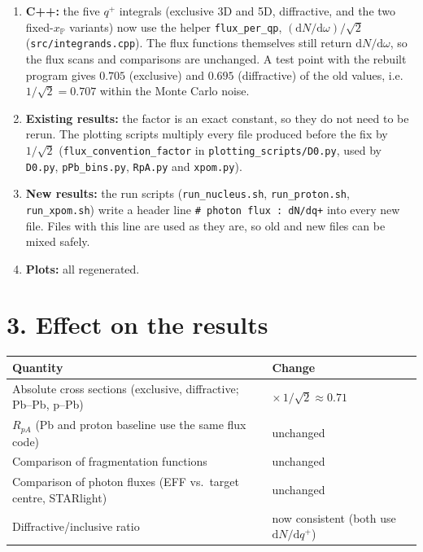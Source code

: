 \documentclass[12pt]{article}
\newcommand{\xpo}{x_{\mathbb{P}}}
\begin{document}
\begin{enumerate}
\item \textbf{C++:} the five $q^+$ integrals (exclusive 3D and 5D, diffractive, and the two
  fixed-$\xpo$ variants) now use the helper \texttt{flux\_per\_qp},
  $(\mathrm{d}N/\mathrm{d}\omega)/\sqrt2$ (\texttt{src/integrands.cpp}). The flux functions
  themselves still return $\mathrm{d}N/\mathrm{d}\omega$, so the flux scans and comparisons are
  unchanged. A test point with the rebuilt program gives $0.705$ (exclusive) and $0.695$ (diffractive)
  of the old values, i.e.\ $1/\sqrt2=0.707$ within the Monte Carlo noise.
\item \textbf{Existing results:} the factor is an exact constant, so they do not need to be rerun.
  The plotting scripts multiply every file produced before the fix by $1/\sqrt2$
  (\texttt{flux\_convention\_factor} in \texttt{plotting\_scripts/D0.py}, used by \texttt{D0.py},
  \texttt{pPb\_bins.py}, \texttt{RpA.py} and \texttt{xpom.py}).
\item \textbf{New results:} the run scripts (\texttt{run\_nucleus.sh}, \texttt{run\_proton.sh},
  \texttt{run\_xpom.sh}) write a header line \texttt{\# photon flux : dN/dq+} into every new file.
  Files with this line are used as they are, so old and new files can be mixed safely.
\item \textbf{Plots:} all regenerated.
\end{enumerate}

\section*{3. Effect on the results}

\begin{center}
\begin{tabular}{ll}
\toprule
Quantity & Change \\
\midrule
Absolute cross sections (exclusive, diffractive; Pb--Pb, p--Pb) & $\times\,1/\sqrt2\approx0.71$ \\
$R_{pA}$ (Pb and proton baseline use the same flux code) & unchanged \\
Comparison of fragmentation functions & unchanged \\
Comparison of photon fluxes (EFF vs.\ target centre, STARlight) & unchanged \\
Diffractive/inclusive ratio & now consistent (both use $\mathrm{d}N/\mathrm{d}q^+$) \\
\bottomrule
\end{tabular}
\end{center}
\end{document}
